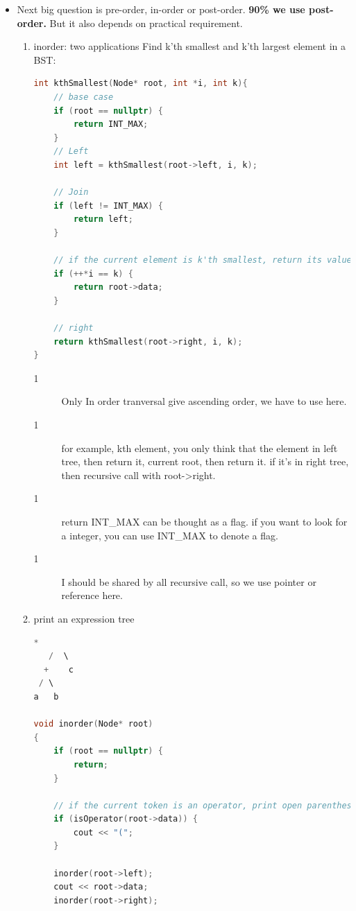 \documentclass[a4paper,11pt,twoside]{book}
\begin{document}
\begin{itemize}
	

\item Next big question is pre-order, in-order or post-order. \textbf{90\% we use post-order.} But it also depends on practical requirement.


\begin{enumerate}
	\item inorder: two applications
	Find k’th smallest and k’th largest element in a BST:
\begin{lstlisting}[frame=single, language=c++]
int kthSmallest(Node* root, int *i, int k){
	// base case
	if (root == nullptr) {
		return INT_MAX;
	}
	// Left
	int left = kthSmallest(root->left, i, k);
	
	// Join
	if (left != INT_MAX) {
		return left;
	}
	
	// if the current element is k'th smallest, return its value
	if (++*i == k) {
		return root->data;
	}
	
	// right
	return kthSmallest(root->right, i, k);
}
\end{lstlisting}
\begin{description}
	\item[1] Only In order tranversal give ascending order, we have to use here.
	
	\item[1] for example, kth element, you only think that the element in left tree, then return it, current root, then return it.  if it's in right tree, then recursive call with root->right.
	
	\item[1] return INT\_MAX can be thought as a flag. if you want to look for a integer, you can use INT\_MAX to denote a flag.
	
	\item[1] I should be shared by all recursive call, so we use pointer or reference here. 
\end{description}

\item print an expression tree
\begin{lstlisting}[frame=single, language=c++]
     *
   /  \
  +    c
 / \
a   b
	
void inorder(Node* root)
{
	if (root == nullptr) {
		return;
	}
	
	// if the current token is an operator, print open parenthesis
	if (isOperator(root->data)) {
		cout << "(";
	}
	
	inorder(root->left);
	cout << root->data;
	inorder(root->right);
	

\end{lstlisting}
\end{enumerate}
\end{itemize}
\end{document}
